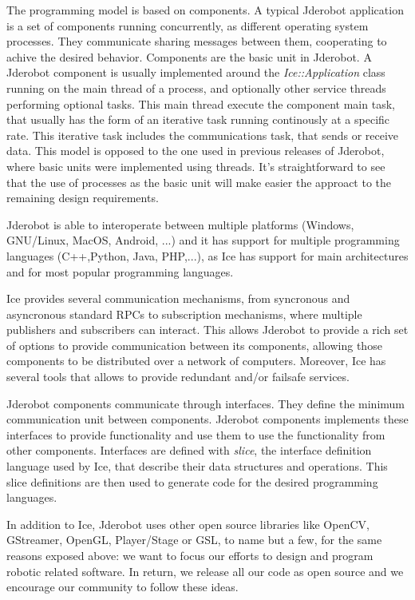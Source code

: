 \documentclass[twocolumn]{svjour3}          %
\begin{document}
The programming model is based on components. A typical Jderobot application is a set of components running concurrently, as different operating system processes. They communicate sharing messages between them, cooperating to achive the desired behavior. Components are the basic unit in Jderobot. A Jderobot component is usually implemented around the \textit{Ice::Application} class running on the main thread of a process, and optionally other service threads performing optional tasks. This main thread execute the component main task, that usually has the form of an iterative task running continously at a specific rate. This iterative task includes the communications task, that sends or receive data. This model is opposed to the one used in previous releases of Jderobot, where basic units were implemented using threads. It's straightforward to see that the use of processes as the basic unit will make easier the approact to the remaining design requirements.

Jderobot is able to interoperate between multiple platforms (Windows, GNU/Linux, MacOS, Android, ...) and it has support for multiple programming languages (C++,Python, Java, PHP,...), as Ice has support for main architectures and for most popular programming languages.

Ice provides several communication mechanisms, from syncronous and asyncronous standard RPCs to subscription mechanisms, where multiple publishers and subscribers can interact. This allows Jderobot to provide a rich set of options to provide communication between its components, allowing those components to be distributed over a network of computers. Moreover, Ice has several tools that allows to provide redundant and/or failsafe services.

Jderobot components communicate through interfaces. They define the minimum communication unit between components. Jderobot components implements these interfaces to provide functionality and use them to use the functionality from other components. Interfaces are defined with \textit{slice}, the interface definition language used by Ice, that describe their data structures and operations. This slice definitions are then used to generate code for the desired programming languages.

In addition to Ice, Jderobot uses other open source libraries like OpenCV, GStreamer, OpenGL, Player/Stage or GSL, to name but a few, for the same reasons exposed above: we want to focus our efforts to design and program robotic related software. In return, we release all our code as open source and we encourage our community to follow these ideas.
\end{document}
